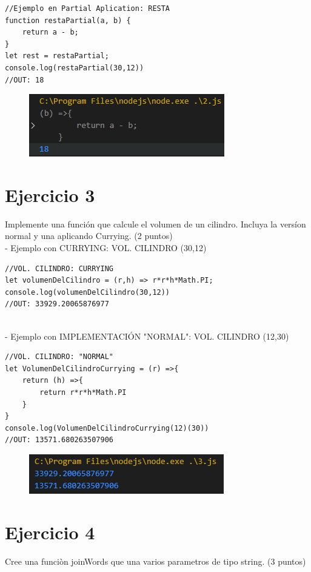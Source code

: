 \documentclass{article}
\begin{document}
\begin{verbatim}
//Ejemplo en Partial Aplication: RESTA
function restaPartial(a, b) {  
    return a - b;  
}  
let rest = restaPartial; 
console.log(restaPartial(30,12))
//OUT: 18
\end{verbatim}

\begin{figure}[h]
\centering
\includegraphics[scale=1.5]{EJERCICIO2.png}
\end{figure}



\newpage
\section{Ejercicio 3}
Implemente una función que calcule el volumen de un cilindro. Incluya la versíon normal y una aplicando Currying. (2 puntos)
\\
- Ejemplo con CURRYING: VOL. CILINDRO (30,12)
\begin{verbatim}
//VOL. CILINDRO: CURRYING
let volumenDelCilindro = (r,h) => r*r*h*Math.PI;
console.log(volumenDelCilindro(30,12))
//OUT: 33929.20065876977
\end{verbatim}
\\
- Ejemplo con IMPLEMENTACIÓN "NORMAL": VOL. CILINDRO (12,30)
\begin{verbatim}
//VOL. CILINDRO: "NORMAL"
let VolumenDelCilindroCurrying = (r) =>{
    return (h) =>{
        return r*r*h*Math.PI
    }
}
console.log(VolumenDelCilindroCurrying(12)(30))
//OUT: 13571.680263507906

\end{verbatim}

\begin{figure}[h]
\centering
\includegraphics[scale=1.5]{EJERCICIO3.png}
\end{figure}


\newpage
\section{Ejercicio 4}
Cree una funciòn joinWords que una varios parametros de tipo string. (3 puntos)
\end{document}
